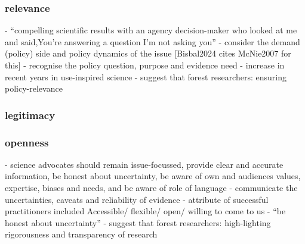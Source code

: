 \subsubsection{relevance}
\cite{Gerber2023} - ``compelling scientific results with an agency decision-maker who looked at me and said,You're answering a question I'm not asking you''
\cite{GluckmanBK2021} - consider the demand (policy) side and policy dynamics of the issue [Bisbal2024 cites McNie2007 for this]
\cite{GluckmanBK2021} - recognise the policy question, purpose and evidence need
\cite{LubchencoR2020} - increase in recent years in use-inspired science
\cite{OjanenBKP2021} - suggest that forest researchers: ensuring policy-relevance

\subsubsection{legitimacy}

\subsubsection{openness}
\cite{ElsensohnACDGGKPRS2019} - science advocates should remain issue-focussed, provide clear and accurate information, be honest about uncertainty, be aware of own and audiences values, expertise, biases and needs, and be aware of role of language
\cite{GluckmanBK2021} - communicate the uncertainties, caveats and reliability of evidence
\cite{GogginEtAl2015} - attribute of successful practitioners included Accessible/ flexible/ open/ willing to come to us
\cite{ElsensohnACDGGKPRS2019} - ``be honest about uncertainty''
\cite{OjanenBKP2021} - suggest that forest researchers: high-lighting rigorousness and transparency of research

